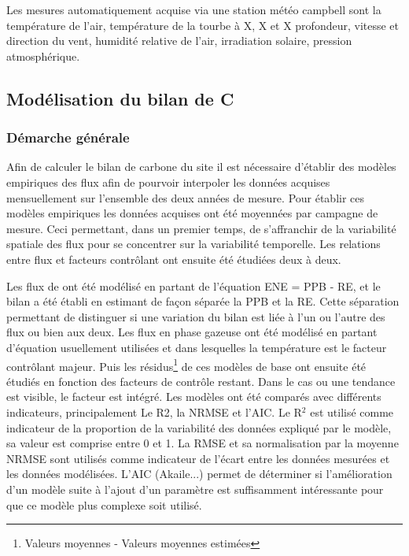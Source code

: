 Les mesures automatiquement acquise via une station météo campbell sont la température de l'air, température de la tourbe à X, X et X profondeur, vitesse et direction du vent, humidité relative de l'air, irradiation solaire, pression atmosphérique.

\subsection{Modélisation du bilan de C}

\subsubsection{Démarche générale}

Afin de calculer le bilan de carbone du site il est nécessaire d'établir des modèles empiriques des flux afin de pourvoir interpoler les données acquises mensuellement sur l'ensemble des deux années de mesure.
Pour établir ces modèles empiriques les données acquises ont été moyennées par campagne de mesure.
Ceci permettant, dans un premier temps, de s'affranchir de la variabilité spatiale des flux pour se concentrer sur la variabilité temporelle.
Les relations entre flux et facteurs contrôlant ont ensuite été étudiées deux à deux.

Les flux de \coo ont été modélisé en partant de l'équation ENE = PPB - RE, et le bilan a été établi en estimant de façon séparée la PPB et la RE.
Cette séparation permettant de distinguer si une variation du bilan est liée à l'un ou l'autre des flux ou bien aux deux.
Les flux en phase gazeuse ont été modélisé en partant d'équation usuellement utilisées et dans lesquelles la température est le facteur contrôlant majeur.
Puis les résidus\footnote{Valeurs moyennes - Valeurs moyennes estimées} de ces modèles de base ont ensuite été étudiés en fonction des facteurs de contrôle restant.
Dans le cas ou une tendance est visible, le facteur est intégré.
Les modèles ont été comparés avec différents indicateurs, principalement Le R2, la NRMSE et l'AIC.
Le R$^{2}$ est utilisé comme indicateur de la proportion de la variabilité des données expliqué par le modèle, sa valeur est comprise entre 0 et 1.
La RMSE et sa normalisation par la moyenne NRMSE sont utilisés comme indicateur de l'écart entre les données mesurées et les données modélisées.
L'AIC (Akaile...) permet de déterminer si l'amélioration d'un modèle suite à l'ajout d'un paramètre est suffisamment intéressante pour que ce modèle plus complexe soit utilisé.

